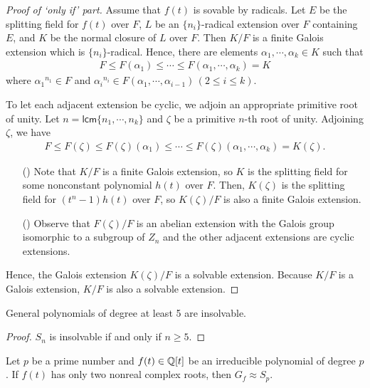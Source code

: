 \begin{proof}[Proof of `only if' part]
    Assume that $f(t)$ is sovable by radicals.
    Let $E$ be the splitting field for $f(t)$ over $F$, $L$ be an $\{n_i\}$-radical extension over $F$ containing $E$, and $K$ be the normal closure of $L$ over $F$.
    Then $K/F$ is a finite Galois extension which is $\{n_i\}$-radical.
    Hence, there are elements $\alpha_1, \cdots, \alpha_k\in K$ such that
    \begin{align*}
        F\leq F(\alpha_1)\leq \cdots\leq F(\alpha_1, \cdots, \alpha_k)=K
    \end{align*}
    where ${\alpha_1}^{n_1}\in F$ and ${\alpha_i}^{n_i}\in F(\alpha_1, \cdots, \alpha_{i-1})\,(2\leq i\leq k)$.

    \color{teal}To let each adjacent extension be cyclic, we adjoin an appropriate primitive root of unity\color{black}.
    Let $n=\textsf{lcm}\{n_1, \cdots, n_k\}$ and $\zeta$ be a primitive $n$-th root of unity.
    Adjoining $\zeta$, we have
    \begin{align*}
        F\leq F(\zeta)\leq F(\zeta)(\alpha_1)\leq \cdots\leq F(\zeta)(\alpha_1, \cdots, \alpha_k)=K(\zeta).
    \end{align*}
    \begin{enumerate}
        \item[(\romannumeral 1)]
        {
            Note that \color{teal}$K/F$ is a finite Galois extension, so $K$ is the splitting field for some nonconstant polynomial $h(t)$ over $F$\color{black}.
            Then, $K(\zeta)$ is the splitting field for $(t^n-1)h(t)$ over $F$, so $K(\zeta)/F$ is also a finite Galois extension.
        }
        \item[(\romannumeral 2)]
        {
            Observe that $F(\zeta)/F$ is an abelian extension with the Galois group isomorphic to a subgroup of $Z_n$ and the other adjacent extensions are cyclic extensions.
        }
    \end{enumerate}
    Hence, the Galois extension $K(\zeta)/F$ is a solvable extension.
    Because $K/F$ is a Galois extension, $K/F$ is also a solvable extension.
\end{proof}
\begin{cor}
    General polynomials of degree at least 5 are insolvable.
\end{cor}
\begin{proof}
    $S_n$ is insolvable if and only if $n\geq 5$.
\end{proof}
\begin{prop}
    Let $p$ be a prime number and $f(t)\in{\mathbb{Q}}[t]$ be an irreducible polynomial of degree $p$.
    If $f(t)$ has only two nonreal complex roots, then $G_f\approx S_p$.
\end{prop}

